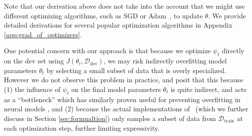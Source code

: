 

Note that our derivation above does not take into the account that we might use different optimizing algorithms, such as SGD or Adam~\citep{adam}, to update $\theta$. We provide detailed derivations for several popular optimization algorithms in Appendix \ref{app:grad_of_optimizers}.

One potential concern with our approach is that because we optimize $\psi_t$ directly on the dev set using $J(\theta_t, \mathcal{D}_\text{dev})$, we may risk indirectly overfitting model parameters $\theta_t$ by selecting a small subset of data that is overly specialized.
However we do not observe this problem in practice, and posit that this because (1) the influence of $\psi_t$ on the final model parameters $\theta_t$ is quite indirect, and acts as a ``bottleneck'' which has similarly proven useful for preventing overfitting in neural models \cite{grezl2007probabilistic}, and (2) because the actual implementations of \dds~(which we further discuss in Section \ref{sec:formualtion}) only samples a subset of data from $\mathcal{D}_\text{train}$ at each optimization step, further limiting expressivity.

